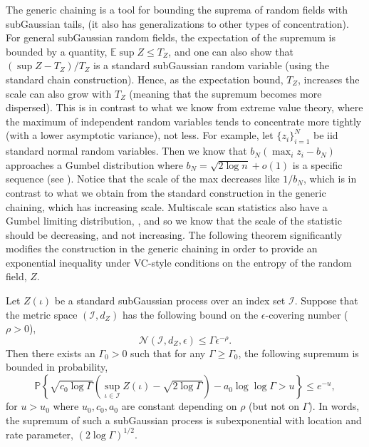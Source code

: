 The generic chaining is a tool for bounding the suprema of random fields with subGaussian tails, \cite{talagrand2006generic} (it also has generalizations to other types of concentration).
For general subGaussian random fields, the expectation of the supremum is bounded by a quantity, $\mathbb E \sup Z \le T_Z$, and one can also show that $(\sup Z - T_Z) / T_Z$ is a standard subGaussian random variable (using the standard chain construction). 
Hence, as the expectation bound, $T_Z$, increases the scale can also grow with $T_Z$ (meaning that the supremum becomes more dispersed).
This is in contrast to what we know from extreme value theory, where the maximum of independent random variables tends to concentrate more tightly (with a lower asymptotic variance), not less.
For example, let $\{z_i\}_{i=1}^N$ be iid standard normal random variables.
Then we know that $b_N (\max_i z_i - b_N)$ approaches a Gumbel distribution where $b_N = \sqrt{2 \log n} + o(1)$ is a specific sequence (see \cite{de2007extreme}).
Notice that the scale of the max decreases like $1 / b_N$, which is in contrast to what we obtain from the standard construction in the generic chaining, which has increasing scale.
Multiscale scan statistics also have a Gumbel limiting distribution, \cite{sharpnack2016exact}, and so we know that the scale of the statistic should be decreasing, and not increasing.
The following theorem significantly modifies the construction in the generic chaining in order to provide an exponential inequality under VC-style conditions on the entropy of the random field, $Z$.

\begin{theorem}
\label{thm:chaining}
Let $Z(\iota)$ be a standard subGaussian process over an index set $\mathcal I$.
Suppose that the metric space $(\mathcal I, d_Z)$ has the following bound on the $\epsilon$-covering number ($\rho > 0$),
\begin{equation}
    \mathcal N(\mathcal I,d_Z, \epsilon) \le \Gamma \epsilon^{-\rho}.
\end{equation}
Then there exists an $\Gamma_0 > 0$ such that for any $\Gamma \ge \Gamma_0$, the following supremum is bounded in probability,
\begin{equation}
    \mathbb P \left\{ \sqrt{c_0 \log \Gamma} \left( \sup_{\iota \in \mathcal I} Z(\iota) - \sqrt{2 \log \Gamma} \right) - a_0 \log \log \Gamma > u \right\} \le e^{-u},
\end{equation}
for $u > u_0$ where $u_0, c_0, a_0$ are constant depending on $\rho$ (but not on $\Gamma$).
In words, the supremum of such a subGaussian process is subexponential with location and rate parameter, $(2 \log \Gamma)^{1/2}$. 
\end{theorem}

